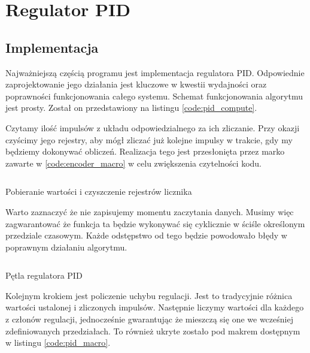     \section{Regulator PID} 
    
    \subsection{Implementacja}
         Najważniejszą częścią programu jest implementacja regulatora PID. Odpowiednie zaprojektowanie jego działania jest kluczowe w kwestii wydajności oraz poprawności funkcjonowania całego systemu. Schemat funkcjonowania algorytmu jest prosty. Został on przedstawiony na listingu \ref{code:pid_compute}. 
         
         Czytamy ilość impulsów z układu odpowiedzialnego za ich zliczanie. Przy okazji czyścimy jego rejestry, aby mógł zliczać już kolejne impulsy w trakcie, gdy my będziemy dokonywać obliczeń. Realizacja tego jest przesłonięta przez marko zawarte w \ref{code:encoder_macro} w celu zwiększenia czytelności kodu. 
         
        \begin{kod}
          \inputminted[firstline=10,lastline=12]{cpp}{esp/listings/encoder_driver.hpp}
          \caption{Pobieranie wartości i czyszczenie rejestrów licznika}
          \label{code:encoder_macro}
          \vspace{1em}
        \end{kod}
         
         
         Warto zaznaczyć że nie zapisujemy momentu zaczytania danych. Musimy więc zagwarantować że funkcja ta będzie wykonywać się cyklicznie w ściśle określonym przedziale czasowym. Każde odstępstwo od tego będzie powodowało błędy w poprawnym działaniu algorytmu. 
         
        \begin{kod}
          \inputminted[firstline=17,lastline=45]{cpp}{esp/listings/pid.cpp}
          \caption{Pętla regulatora PID}
          \label{code:pid_compute}
          \vspace{2em}
        \end{kod}
    
         Kolejnym krokiem jest policzenie uchybu regulacji. Jest to tradycyjnie różnica wartości ustalonej i zliczonych impulsów. Następnie liczymy wartości dla każdego z członów regulacji, jednocześnie gwarantując że mieszczą się one we wcześniej zdefiniowanych przedziałach. To również ukryte zostało pod makrem dostępnym w listingu \ref{code:pid_macro}.
         
